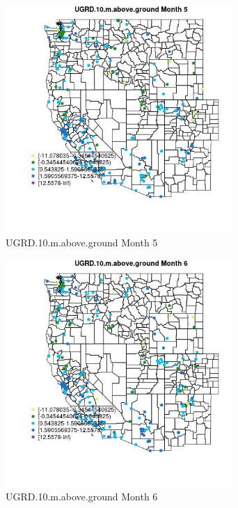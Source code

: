 \begin{figure} 
\centering  
\includegraphics[width=0.77\textwidth]{Code_Outputs/Report_ML_input_PM25_Step4_part_e_de_duplicated_aveswNAs_MapObsMo5UGRD10maboveground.jpg} 
\caption{\label{fig:Report_ML_input_PM25_Step4_part_e_de_duplicated_aveswNAsMapObsMo5UGRD10maboveground}UGRD.10.m.above.ground Month 5} 
\end{figure} 
 

\begin{figure} 
\centering  
\includegraphics[width=0.77\textwidth]{Code_Outputs/Report_ML_input_PM25_Step4_part_e_de_duplicated_aveswNAs_MapObsMo6UGRD10maboveground.jpg} 
\caption{\label{fig:Report_ML_input_PM25_Step4_part_e_de_duplicated_aveswNAsMapObsMo6UGRD10maboveground}UGRD.10.m.above.ground Month 6} 
\end{figure} 
 


